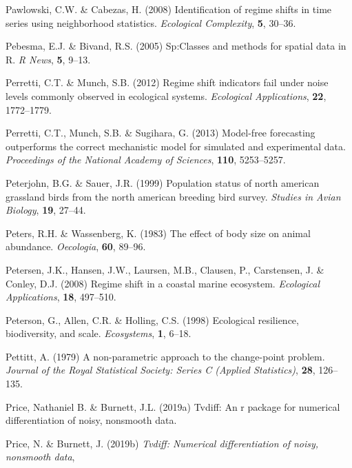 \documentclass[12pt,twoside,openany]{reedthesis}
\begin{document}
\leavevmode\hypertarget{ref-pawlowski_identification_2008}{}%
Pawlowski, C.W. \& Cabezas, H. (2008) Identification of regime shifts in time series using neighborhood statistics. \emph{Ecological Complexity}, \textbf{5}, 30--36.

\leavevmode\hypertarget{ref-sp}{}%
Pebesma, E.J. \& Bivand, R.S. (2005) Sp:Classes and methods for spatial data in R. \emph{R News}, \textbf{5}, 9--13.

\leavevmode\hypertarget{ref-perretti2012regime}{}%
Perretti, C.T. \& Munch, S.B. (2012) Regime shift indicators fail under noise levels commonly observed in ecological systems. \emph{Ecological Applications}, \textbf{22}, 1772--1779.

\leavevmode\hypertarget{ref-perretti_model-free_2013}{}%
Perretti, C.T., Munch, S.B. \& Sugihara, G. (2013) Model-free forecasting outperforms the correct mechanistic model for simulated and experimental data. \emph{Proceedings of the National Academy of Sciences}, \textbf{110}, 5253--5257.

\leavevmode\hypertarget{ref-peterjohn1999population}{}%
Peterjohn, B.G. \& Sauer, J.R. (1999) Population status of north american grassland birds from the north american breeding bird survey. \emph{Studies in Avian Biology}, \textbf{19}, 27--44.

\leavevmode\hypertarget{ref-peters1983effect}{}%
Peters, R.H. \& Wassenberg, K. (1983) The effect of body size on animal abundance. \emph{Oecologia}, \textbf{60}, 89--96.

\leavevmode\hypertarget{ref-petersen2008regime}{}%
Petersen, J.K., Hansen, J.W., Laursen, M.B., Clausen, P., Carstensen, J. \& Conley, D.J. (2008) Regime shift in a coastal marine ecosystem. \emph{Ecological Applications}, \textbf{18}, 497--510.

\leavevmode\hypertarget{ref-peterson1998ecological}{}%
Peterson, G., Allen, C.R. \& Holling, C.S. (1998) Ecological resilience, biodiversity, and scale. \emph{Ecosystems}, \textbf{1}, 6--18.

\leavevmode\hypertarget{ref-pettitt1979non}{}%
Pettitt, A. (1979) A non-parametric approach to the change-point problem. \emph{Journal of the Royal Statistical Society: Series C (Applied Statistics)}, \textbf{28}, 126--135.

\leavevmode\hypertarget{ref-price2019tvdiff}{}%
Price, Nathaniel B. \& Burnett, J.L. (2019a) Tvdiff: An r package for numerical differentiation of noisy, nonsmooth data.

\leavevmode\hypertarget{ref-tvdiff}{}%
Price, N. \& Burnett, J. (2019b) \emph{Tvdiff: Numerical differentiation of noisy, nonsmooth data},
\end{document}
